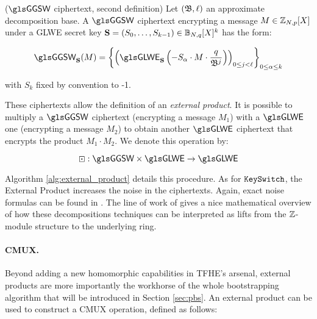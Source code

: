 \begin{definition}($\GGSW$ ciphertext, second definition)
	\label{def:ggsw2}
	Let $(\mathfrak{B}, \ell)$ an approximate decomposition base. A $\GGSW$ ciphertext encrypting a message $M \in \mathbb{Z}_{N,p}[X]$ under a GLWE secret key $\mathbf S =  (S_0, \dots, S_{k-1}) \in \mathbb{B}_{N, q}[X]^k$ has the form:
	
	\begin{equation*}
		\GGSW_{\glweSecretKey}(M) = \left \lbrace \left ( \GLWE_{\glweSecretKey}\left (-S_\alpha \cdot M \cdot \frac{q}{\baseDecomp^j} \right) \right )_{0 \le j < \levelDecomp} \right \rbrace_{0\le \alpha \le k}
	\end{equation*}
	
	\noindent with $S_{k}$ fixed by convention to -1.
\end{definition}


These ciphertexts allow the definition of an \textit{external product}. It is possible to multiply a $\GGSW$ ciphertext (encrypting a message $M_1$) with a $\GLWE$ one (encrypting a message $M_2$) to obtain another $\GLWE$ ciphertext that encrypts the product $M_1 \cdot M_2$. We denote this operation by:

\begin{equation*}
		\boxdot: \GGSW \times \GLWE \rightarrow \GLWE
\end{equation*}


Algorithm \ref{alg:external_product} details this procedure. As for $\texttt{KeySwitch}$, the External Product increases the noise in the ciphertexts. Again, exact noise formulas can be found in \cite{JC:CGGI20, these_tap}. The line of work of \cite{chimera, AC:BCGGJ24} gives a nice mathematical overview of how these decompositions techniques can be interpreted as lifts from the $\mathbb{Z}$-module structure to the underlying ring. 






\paragraph{CMUX.}

Beyond adding a new homomorphic capabilities in \gls{TFHE}'s arsenal, external products are more importantly the workhorse of the whole bootstrapping algorithm that will be introduced in Section \ref{sec:pbs}. An external product can be used to construct a CMUX operation, defined as follows:

